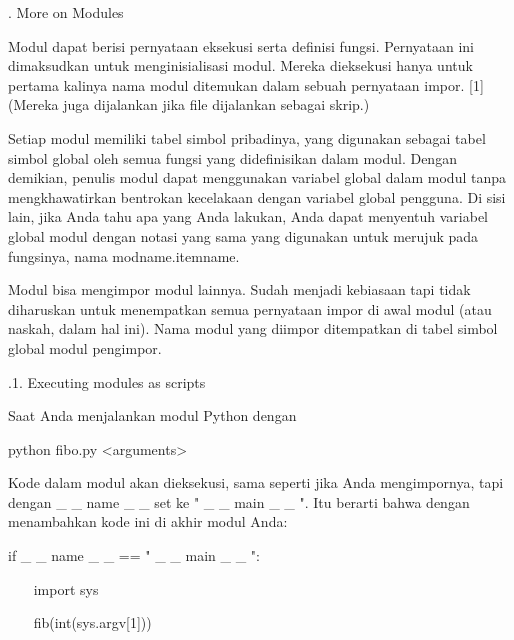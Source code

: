 \vspace{12pt}
. More on Modules \par
\noindent 
Modul dapat berisi pernyataan eksekusi serta definisi fungsi. Pernyataan ini dimaksudkan untuk menginisialisasi modul. Mereka dieksekusi hanya untuk pertama kalinya nama modul ditemukan dalam sebuah pernyataan impor. [1] (Mereka juga dijalankan jika file dijalankan sebagai skrip.) \par
\noindent 
Setiap modul memiliki tabel simbol pribadinya, yang digunakan sebagai tabel simbol global oleh semua fungsi yang didefinisikan dalam modul. Dengan demikian, penulis modul dapat menggunakan variabel global dalam modul tanpa mengkhawatirkan bentrokan kecelakaan dengan variabel global pengguna. Di sisi lain, jika Anda tahu apa yang Anda lakukan, Anda dapat menyentuh variabel global modul dengan notasi yang sama yang digunakan untuk merujuk pada fungsinya, nama modname.itemname. \par
\noindent 
Modul bisa mengimpor modul lainnya. Sudah menjadi kebiasaan tapi tidak diharuskan untuk menempatkan semua pernyataan impor di awal modul (atau naskah, dalam hal ini). Nama modul yang diimpor ditempatkan di tabel simbol global modul pengimpor. \par
\vspace{12pt}
\vspace{12pt}
\vspace{12pt}
\vspace{12pt}
\vspace{12pt}
\vspace{12pt}
.1. Executing modules as scripts \par
\noindent 
Saat Anda menjalankan modul Python dengan \par
\vspace{12pt}
\noindent 
python fibo.py <arguments> \par
\noindent 
Kode dalam modul akan dieksekusi, sama seperti jika Anda mengimpornya, tapi dengan    \_     \_  name   \_     \_   set ke "   \_     \_  main   \_     \_  ". Itu berarti bahwa dengan menambahkan kode ini di akhir modul Anda: \par
\vspace{12pt}
\noindent 
if    \_     \_  name   \_     \_   == "   \_     \_  main   \_     \_  ": \par
\noindent 
~~~ import sys \par
\noindent 
~~~ fib(int(sys.argv[1])) \par
\vspace{12pt}

